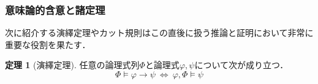 \documentclass[uplatex,a4paper,dvipdfmx]{jsarticle}
\theoremstyle{definition}
\newtheorem{thm}{定理}
\begin{document}
            \subsubsection{意味論的含意と諸定理}
                次に紹介する演繹定理やカット規則はこの直後に扱う推論と証明において非常に重要な役割を果たす．

                \begin{thm}[演繹定理]
                    任意の論理式列$\Phi$と論理式$\varphi, \psi$について次が成り立つ．
                    \begin{equation}
                        \Phi \vDash \varphi \to \psi\ \Longleftrightarrow\ \varphi, \Phi \vDash \psi
                    \end{equation}
                \end{thm}
\end{document}
